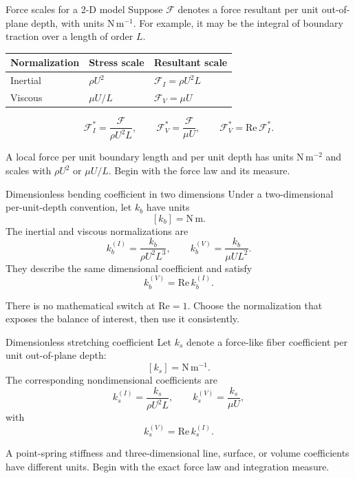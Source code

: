 \documentclass[aspectratio=169,11pt]{beamer}
\begin{document}
\begin{frame}{Force scales for a 2-D model}
Suppose $\mathcal F$ denotes a force resultant per unit out-of-plane depth, with units $\mathrm{N\,m^{-1}}$. For example, it may be the integral of boundary traction over a length of order $L$.
\begin{center}
\renewcommand{\arraystretch}{1.3}
\begin{tabular}{lll}
\toprule
Normalization & Stress scale & Resultant scale \\
\midrule
Inertial & $\rho U^2$ & $\mathcal F_I=\rho U^2L$ \\
Viscous & $\mu U/L$ & $\mathcal F_V=\mu U$ \\
\bottomrule
\end{tabular}
\end{center}
\[
  \mathcal F_I^*=\frac{\mathcal F}{\rho U^2L},
  \qquad
  \mathcal F_V^*=\frac{\mathcal F}{\mu U},
  \qquad
  \boxed{\mathcal F_V^*=\mathrm{Re}\,\mathcal F_I^*}.
\]
\begin{punchbox}
\small A local force per unit boundary length and per unit depth has units $\mathrm{N\,m^{-2}}$ and scales with $\rho U^2$ or $\mu U/L$. Begin with the force law and its measure.
\end{punchbox}
\end{frame}

\begin{frame}{Dimensionless bending coefficient in two dimensions}
Under a two-dimensional per-unit-depth convention, let $k_b$ have units
\[
  [k_b]=\mathrm{N\,m}.
\]
The inertial and viscous normalizations are
\[
  \boxed{k_b^{(I)}=\frac{k_b}{\rho U^2L^3}},
  \qquad
  \boxed{k_b^{(V)}=\frac{k_b}{\mu UL^2}}.
\]
They describe the same dimensional coefficient and satisfy
\[
  k_b^{(V)}=\mathrm{Re}\,k_b^{(I)}.
\]
\begin{punchbox}
\small There is no mathematical switch at $\mathrm{Re}=1$. Choose the normalization that exposes the balance of interest, then use it consistently.
\end{punchbox}
\end{frame}

\begin{frame}{Dimensionless stretching coefficient}
Let $k_s$ denote a force-like fiber coefficient per unit out-of-plane depth:
\[
  [k_s]=\mathrm{N\,m^{-1}}.
\]
The corresponding nondimensional coefficients are
\[
  \boxed{k_s^{(I)}=\frac{k_s}{\rho U^2L}},
  \qquad
  \boxed{k_s^{(V)}=\frac{k_s}{\mu U}},
\]
with
\[
  k_s^{(V)}=\mathrm{Re}\,k_s^{(I)}.
\]
\begin{punchbox}
\small A point-spring stiffness and three-dimensional line, surface, or volume coefficients have different units. Begin with the exact force law and integration measure.
\end{punchbox}
\end{frame}
\end{document}
